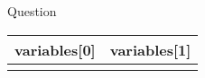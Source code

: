 \begin{minipage}{\linewidth}
    \Huge
{{ Question }}\\

    \begin{tabular}{ | c | c |}
    \hline
    {{ variables[0] }} & {{ variables[1] }} \\ \hline
    {%
        {%
    {%
    \hline
    \end{tabular}
\end{minipage}
